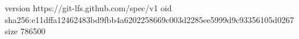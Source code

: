 version https://git-lfs.github.com/spec/v1
oid sha256:e11dffa12462483bd9fbb4a6202258669c003d2285ee5999d9c93356105d0267
size 786500
